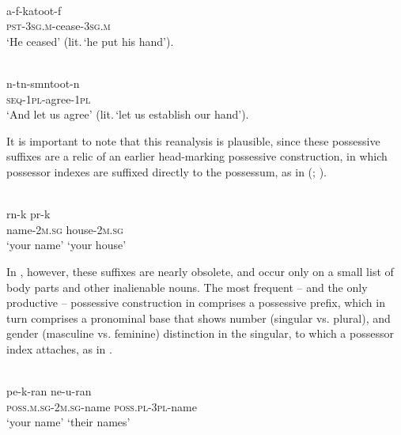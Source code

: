 \documentclass[output=paper]{LSP/langsci}
\begin{document}
\begin{exe}
\ex%
\label{05-gr-ex:26}
\\
\gll a-f-katoot-f\\
\textsc{pst-3sg.m}-cease-\textsc{3sg.m}\\
\glt ‘He ceased’ (lit.\,‘he put his hand’). %
\end{exe}

\begin{exe}
\ex%
\label{05-gr-ex:27}
\\
\gll n-tn-smntoot-n\\
\textsc{seq-1pl}-agree-\textsc{1pl}\\
\glt ‘And let us agree’ (lit.\,‘let us establish our hand’). %
\end{exe}

It is important to note that this reanalysis is plausible, since these possessive suffixes are a relic of an earlier head-marking possessive construction, in which possessor indexes are suffixed directly to the possessum, as in  (\citealt{Egedi2010Possessive}; \citealt{Haspelmath2015Three}).

\begin{exe}
\ex %
\label{05-gr-ex:28}
\\
\gll rn-k pr-k\\
 name-\textsc{2m.sg} house-\textsc{2m.sg}\\
\glt ‘your name’ { }{ }{ }‘your house’
\end{exe}

In , however, these suffixes are nearly obsolete, and occur only on a small list of body parts and other inalienable nouns. The most frequent – and the only productive – possessive construction in  comprises a possessive prefix, which in turn comprises a pronominal base that shows number (singular vs. plural), and gender (masculine vs. feminine) distinction in the singular, to which a possessor index attaches, as in .

\begin{exe}
\ex%
\label{05-gr-ex:29}
\\
\gll pe-k-ran ne-u-ran\\
\textsc{poss.m.sg-2m.sg}-name \textsc{poss.pl-3pl}-name\\
\glt ‘your name’ { }{ }{ }{ }{ }{ }{ }{ }{ }{ }{ }{ }{ }{ }{ }{ }{ }{ }{ }{ }‘their names’
\end{exe}
\end{document}
